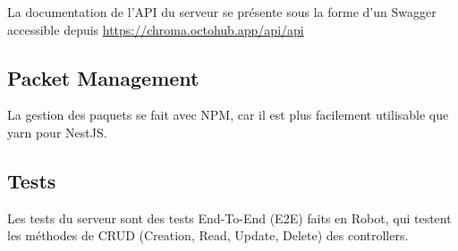 La documentation de l’API du serveur se présente sous la forme d’un Swagger accessible depuis \url{https://chroma.octohub.app/api/api}

\subsection*{Packet Management}
La gestion des paquets se fait avec NPM, car il est plus facilement utilisable que yarn pour NestJS.

\subsection*{Tests}
Les tests du serveur sont des tests End-To-End (E2E) faits en Robot, qui testent les méthodes de CRUD (Creation, Read, Update, Delete) des controllers. 
